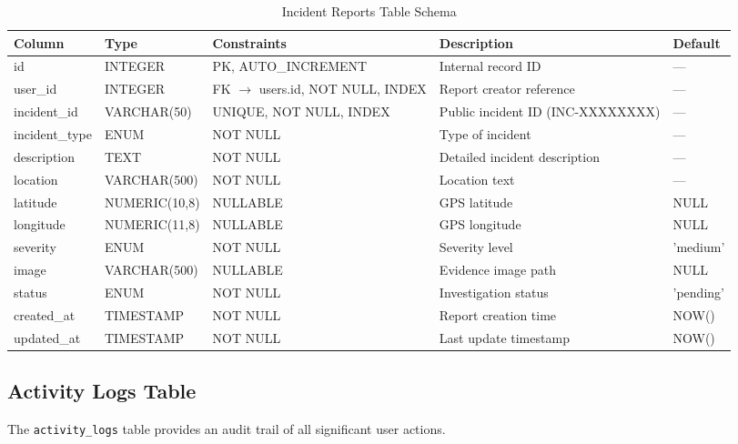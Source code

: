 \begin{table}[H]
  \centering
  \caption{Incident Reports Table Schema}
  \label{tab:schema-incident}
  \begin{tabularx}{\textwidth}{@{}l l l X l@{}}
    \toprule
    \textbf{Column} & \textbf{Type} & \textbf{Constraints} & \textbf{Description} & \textbf{Default} \\
    \midrule
    id & INTEGER & PK, AUTO\_INCREMENT & Internal record ID & --- \\
    user\_id & INTEGER & FK $\to$ users.id, NOT NULL, INDEX & Report creator reference & --- \\
    incident\_id & VARCHAR(50) & UNIQUE, NOT NULL, INDEX & Public incident ID (INC-XXXXXXXX) & --- \\
    incident\_type & ENUM & NOT NULL & Type of incident & --- \\
    description & TEXT & NOT NULL & Detailed incident description & --- \\
    location & VARCHAR(500) & NOT NULL & Location text & --- \\
    latitude & NUMERIC(10,8) & NULLABLE & GPS latitude & NULL \\
    longitude & NUMERIC(11,8) & NULLABLE & GPS longitude & NULL \\
    severity & ENUM & NOT NULL & Severity level & 'medium' \\
    image & VARCHAR(500) & NULLABLE & Evidence image path & NULL \\
    status & ENUM & NOT NULL & Investigation status & 'pending' \\
    created\_at & TIMESTAMP & NOT NULL & Report creation time & NOW() \\
    updated\_at & TIMESTAMP & NOT NULL & Last update timestamp & NOW() \\
    \bottomrule
  \end{tabularx}
\end{table}

\subsection{Activity Logs Table}

The \texttt{activity\_logs} table provides an audit trail of all significant user actions.

